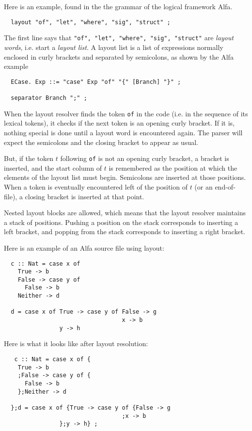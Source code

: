 \documentclass[10pt]{article}
\begin{document}
Here is an example, found in the the grammar of the logical framework Alfa.
\begin{verbatim}
  layout "of", "let", "where", "sig", "struct" ;
\end{verbatim}
The first line says that {\tt "of", "let", "where", "sig", "struct"}
are {\em layout words}, i.e. start a
{\em layout list}. A layout list is a list of expressions
normally enclosed in curly brackets and separated by semicolons,
as shown by the Alfa example
\begin{verbatim}
  ECase. Exp ::= "case" Exp "of" "{" [Branch] "}" ;

  separator Branch ";" ;
\end{verbatim}
When the layout resolver finds the token {\tt of} in the code
(i.e. in the sequence of its lexical tokens), it
checks if the next token is an opening curly bracket. If it
is, nothing special is done until a layout word is encountered again.
The parser will expect the semicolons and the closing bracket
to appear as usual.

But, if the token $t$
following {\tt of} is not an opening curly bracket,
a bracket is inserted, and the start column of $t$
is remembered as the position at which the elements of the
layout list must begin. Semicolons are inserted at those
positions. When a token is eventually encountered left
of the position of $t$ (or an end-of-file), a closing bracket
is inserted at that point.

Nested layout blocks are allowed, which means that the layout
resolver maintains a stack of positions. Pushing a position
on the stack corresponds to inserting a left bracket, and
popping from the stack corresponds to inserting a right bracket.

Here is an example of an Alfa source file using layout:
\begin{verbatim}
  c :: Nat = case x of
    True -> b
    False -> case y of
      False -> b
    Neither -> d

  d = case x of True -> case y of False -> g
                                  x -> b
                y -> h
\end{verbatim}
Here is what it looks like after layout resolution:
\begin{verbatim}
   c :: Nat = case x of {
    True -> b
    ;False -> case y of {
      False -> b
    };Neither -> d

  };d = case x of {True -> case y of {False -> g
                                  ;x -> b
                };y -> h} ;
\end{verbatim}
\end{document}
